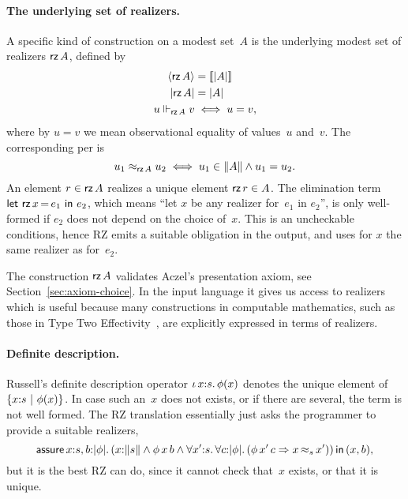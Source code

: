 \paragraph{The underlying set of realizers.}
%
A specific kind of construction on a modest set~$A$ is the underlying
modest set of realizers $\textsf{rz}\,A$, defined by
%
\begin{align*}
  \langle \textsf{rz}\,A \rangle &= [\![|A|]\!] \\
  |\textsf{rz}\,A| &= |A| \\
  u \Vdash_{\textsf{rz}\,A} v &\iff u = v,
\end{align*}
%
where by $u = v$ we mean observational equality of values~$u$ and~$v$.
The corresponding per is
%
\begin{equation*}
  u_1 \approx_{\textsf{rz}\,A} u_2 \iff u_1 \in \|A\| \land u_1 = u_2.
\end{equation*}
%
An element $r \in \textsf{rz}\,A$ realizes a unique element $\textsf{rz}\,r \in A$.
The elimination term $\textsf{let}\ \textsf{rz}\,x\,{=}\,e_1\ \textsf{in}\ e_2$, which means ``let $x$ be
any realizer for~$e_1$ in $e_2$'', is only well-formed if $e_2$ does
not depend on the choice of~$x$. This is an uncheckable conditions,
hence RZ emits a suitable obligation in the output, and uses for $x$
the same realizer as for~$e_2$.

The construction $\textsf{rz}\,A$ validates Aczel's presentation axiom, see
Section~\ref{sec:axiom-choice}. In the input language it gives us
access to realizers which is useful because many constructions in
computable mathematics, such as those in Type Two
Effectivity~\cite{Wei00}, are explicitly expressed in terms of
realizers.


\paragraph{Definite description.}
%
Russell's definite description operator $\iota\,x{:}s{.}\, \phi(x)$ denotes
the unique element of $\{x{:}s\ |\ \phi(x)\}$. In case such an~$x$
does not exists, or if there are several, the term is not well formed.
The RZ translation essentially just asks the programmer to provide a
suitable realizers,
%
\begin{equation*}
  \ooblig{x{:}s,b}{\typeOf{\phi}}{
    (\ototal{x}{s} \land \oapp{\oapp{\phi}{x}}{b} \land
    \oforall{x'}{s}{
      \oforall{c}{\typeOf{\phi}}{
        (\oimply{\oapp{\oapp{\phi}{x'}}{c}}{\oper{s}{x}{x'}})
      }
    })
    }{(x,b)},
\end{equation*}
%
but it is the best RZ can do, since it cannot check that~$x$ exists,
or that it is unique.


